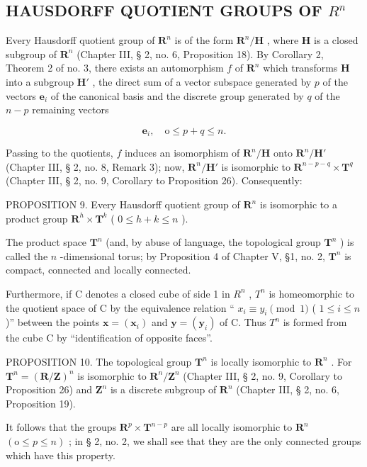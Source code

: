 \subsection{\texorpdfstring{HAUSDORFF QUOTIENT GROUPS OF \(R^{n}\)}{HAUSDORFF QUOTIENT GROUPS OF R TO THE N}}

Every Hausdorff quotient group of \(\mathbf{R}^n\) is of the form \(\mathbf{R}^n/\mathbf{H}\) , where \(\mathbf{H}\) is a closed subgroup of \(\mathbf{R}^n\) (Chapter III, § 2, no. 6, Proposition 18). By Corollary 2, Theorem 2 of no. 3, there exists an automorphism \(f\) of \(\mathbf{R}^n\) which transforms \(\mathbf{H}\) into a subgroup \(\mathbf{H}'\) , the direct sum of a vector subspace generated by \(p\) of the vectors \(\boldsymbol{e}_i\) of the canonical basis and the discrete group generated by \(q\) of the \(n-p\) remaining vectors

\[
\boldsymbol {e} _ {i}, \quad \mathrm{o} \leqslant p + q \leqslant n.
\]

Passing to the quotients, \(f\) induces an isomorphism of \(\mathbf{R}^n / \mathbf{H}\) onto \(\mathbf{R}^n / \mathbf{H}'\) (Chapter III, § 2, no. 8, Remark 3); now, \(\mathbf{R}^n / \mathbf{H}'\) is isomorphic to \(\mathbf{R}^{n - p - q} \times \mathbf{T}^q\) (Chapter III, § 2, no. 9, Corollary to Proposition 26). Consequently:

PROPOSITION 9. Every Hausdorff quotient group of \(\mathbf{R}^{n}\) is isomorphic to a product group \(\mathbf{R}^{h} \times \mathbf{T}^{k}\) ( \(0 \leqslant h + k \leqslant n\) ).

The product space \(\mathbf{T}^n\) (and, by abuse of language, the topological group \(\mathbf{T}^n\) ) is called the \(n\) -dimensional torus; by Proposition 4 of Chapter V, §1, no. 2, \(\mathbf{T}^n\) is compact, connected and locally connected.

Furthermore, if C denotes a closed cube of side 1 in \(R^{n}\) , \(T^{n}\) is homeomorphic to the quotient space of C by the equivalence relation `` \(x_{i} \equiv y_{i} \pmod{1}\) ( \(1 \leqslant i \leqslant n\) )'' between the points \(\boldsymbol{x} = (\boldsymbol{x}_{i})\) and \(\boldsymbol{y} = (\boldsymbol{y}_{i})\) of C. Thus \(T^{n}\) is formed from the cube C by ``identification of opposite faces''.

PROPOSITION 10. The topological group \(\mathbf{T}^n\) is locally isomorphic to \(\mathbf{R}^n\) . For \(\mathbf{T}^n = (\mathbf{R}/\mathbf{Z})^n\) is isomorphic to \(\mathbf{R}^n/\mathbf{Z}^n\) (Chapter III, § 2, no. 9, Corollary to Proposition 26) and \(\mathbf{Z}^n\) is a discrete subgroup of \(\mathbf{R}^n\) (Chapter III, § 2, no. 6, Proposition 19).

It follows that the groups \(\mathbf{R}^p\times \mathbf{T}^{n - p}\) are all locally isomorphic to \(\mathbf{R}^n\) \((\mathrm{o}\leqslant p\leqslant n)\) ; in § 2, no. 2, we shall see that they are the only connected groups which have this property.

